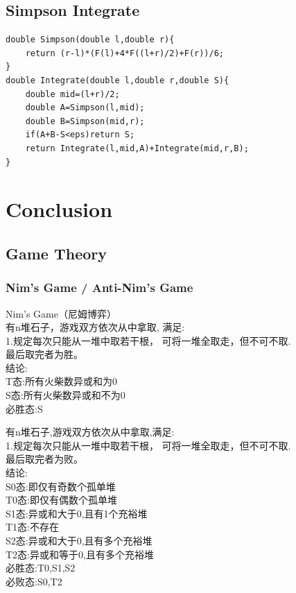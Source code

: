 \documentclass[10pt]{ctexart}
\begin{document}
{{\subsection{Simpson Integrate}
\begin{lstlisting}
double Simpson(double l,double r){
    return (r-l)*(F(l)+4*F((l+r)/2)+F(r))/6;
}
double Integrate(double l,double r,double S){
    double mid=(l+r)/2;
    double A=Simpson(l,mid);
    double B=Simpson(mid,r);
    if(A+B-S<eps)return S;
    return Integrate(l,mid,A)+Integrate(mid,r,B);
}
\end{lstlisting}

\newpage
\section{Conclusion}
\subsection{Game Theory}
\subsubsection{Nim’s Game / Anti-Nim's Game}
Nim’s Game（尼姆博弈）\\
有n堆石子，游戏双方依次从中拿取, 满足:\\
1.规定每次只能从一堆中取若干根， 可将一堆全取走，但不可不取.\\
最后取完者为胜。\\
结论:\\
T态:所有火柴数异或和为0\\
S态:所有火柴数异或和不为0\\
必胜态:S\\
\par
有n堆石子,游戏双方依次从中拿取,满足:\\
1.规定每次只能从一堆中取若干根， 可将一堆全取走，但不可不取.\\
最后取完者为败。\\
结论:\\
S0态:即仅有奇数个孤单堆\\
T0态:即仅有偶数个孤单堆\\
S1态:异或和大于0,且有1个充裕堆\\
T1态:不存在\\
S2态:异或和大于0,且有多个充裕堆\\
T2态:异或和等于0,且有多个充裕堆\\
必胜态:T0,S1,S2\\
必败态:S0,T2\\
}}
\end{document}
